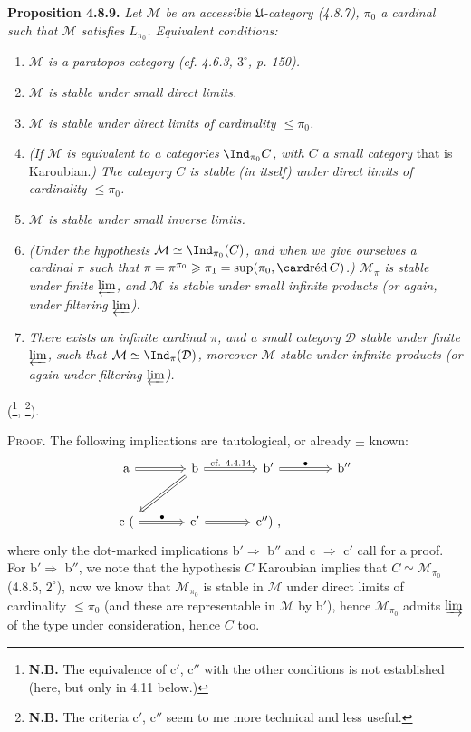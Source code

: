\textbf{Proposition 4.8.9.} \textit{Let $\mathcal{M}$ be an accessible $\mathfrak{U}$-category (4.8.7), $\pi_0$ a cardinal such that $\mathcal{M}$ satisfies $L_{\pi_0}$. Equivalent conditions:}
\begin{enumerate}
\item[\textit{a)}] \textit{$\mathcal{M}$ is a paratopos category (cf. 4.6.3, $3^\circ$, p. 150).}
\item[\textit{b)}] \textit{$\mathcal{M}$ is stable under small direct limits.}
\item[\textit{b$'$)}] \textit{$\mathcal{M}$ is stable under direct limits of cardinality $\leqslant\pi_0$.}
\item[\textit{b$''$)}] \textit{(If $\mathcal{M}$ is equivalent to a categories} $\Ind_{\pi_0}C$\textit{, with $C$ a small category} that is Karoubian.\textit{) The category $C$ is stable (in itself) under direct limits of cardinality $\leqslant\pi_0$.} %
\item[\textit{c)}] \textit{$\mathcal{M}$ is stable under small inverse limits.}
\item[\textit{c$'$)}] \textit{(Under the hypothesis $\mathcal{M}\simeq\Ind_{\pi_0}(C)$, and when we give ourselves a cardinal $\pi$ such that $\pi=\pi^{\pi_0}\geqslant\pi_1=\sup(\pi_0,\card\textup{réd}\,C)$.) $\mathcal{M}_\pi$ is stable under finite $\varprojlim$, and $\mathcal{M}$ is stable under small infinite products (or again, under filtering $\varprojlim$).}
\item[\textit{c$''$)}] \textit{There exists an infinite cardinal $\pi$, and a small category $\mathcal{D}$ stable under finite $\varprojlim$, such that $\mathcal{M}\simeq\Ind_\pi(\mathcal{D})$, moreover $\mathcal{M}$ stable under infinite products (or again under filtering $\varprojlim$).}
\end{enumerate}
(\footnote{\textbf{N.B.} The equivalence of c$'$, c$''$ with the other conditions is not established (here, but only in 4.11 below.)}, \footnote{\textbf{N.B.} The criteria c$'$, c$''$ seem to me more technical and less useful.}).

\textsc{Proof.} The following implications are tautological, or already $\pm$ known:
\[
\begin{tikzcd}[column sep=large, row sep=large]
\mathrm{a} \arrow[r, Rightarrow] & \mathrm{b} \arrow[r, Rightarrow, "\text{cf. 4.4.14}"] \arrow[dl, Rightarrow] & \mathrm{b}' \arrow[r, Rightarrow, "\bullet"] & \mathrm{b}'' \\
\mathrm{c}\ ( \arrow[r, Rightarrow, "\bullet"] & \mathrm{c}' \arrow[r, Rightarrow] & \mathrm{c}'')\ , &
\end{tikzcd}
\]
where only the dot-marked implications b$'\Longrightarrow$ b$''$ and c $\Longrightarrow$ c$'$ call for a proof. For b$'\Longrightarrow$ b$''$, we note that the hypothesis $C$ Karoubian implies that $C\simeq\mathcal{M}_{\pi_0}$ (4.8.5, $2^\circ$), now we know that $\mathcal{M}_{\pi_0}$ is stable in $\mathcal{M}$ under direct limits of cardinality $\leqslant\pi_0$ (and these are representable in $\mathcal{M}$ by b$'$), hence $\mathcal{M}_{\pi_0}$ admits $\varinjlim$ of the type under consideration, hence $C$ too.

